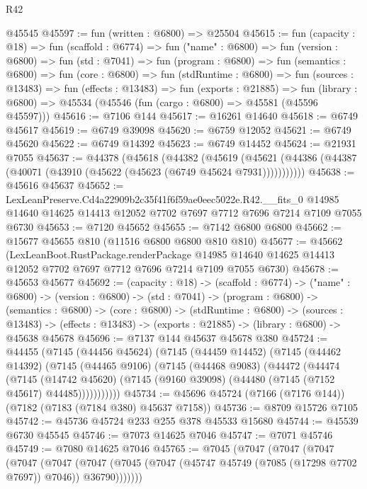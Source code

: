 \begin{lexlean}{R42}
\begin{coremodule}
{    @45545
@45597 := fun (written : @6800) => @25504
@45615 := fun (capacity : @18) =>
  fun (scaffold : @6774) =>
  fun ("name" : @6800) =>
  fun (version : @6800) =>
  fun (std : @7041) =>
  fun (program : @6800) =>
  fun (semantics : @6800) =>
  fun (core : @6800) =>
  fun (stdRuntime : @6800) =>
  fun (sources : @13483) =>
  fun (effects : @13483) =>
  fun (exports : @21885) =>
  fun (library : @6800) => @45534 (@45546 (fun (cargo : @6800) => @45581 (@45596 @45597)))
@45616 := @7106 @144
@45617 := @16261 @14640
@45618 := @6749 @45617
@45619 := @6749 @39098
@45620 := @6759 @12052
@45621 := @6749 @45620
@45622 := @6749 @14392
@45623 := @6749 @14452
@45624 := @21931 @7055
@45637 := @44378
    (@45618
      (@44382
        (@45619
          (@45621 (@44386 (@44387 (@40071 (@43910 (@45622 (@45623 (@6749 @45624 @7931)))))))))))
@45638 := @45616 @45637
@45652 := LexLeanPreserve.Cd4a22909b2c35f41f6f59ae0eec5022e.R42.__fits_0
    @14985
    @14640
    @14625
    @14413
    @12052
    @7702
    @7697
    @7712
    @7696
    @7214
    @7109
    @7055
    @6730
@45653 := @7120 @45652
@45655 := @7142 @6800 @6800
@45662 := @15677 @45655 @810 (@11516 @6800 @6800 @810 @810)
@45677 := @45662
    (LexLeanBoot.RustPackage.renderPackage
      @14985
      @14640
      @14625
      @14413
      @12052
      @7702
      @7697
      @7712
      @7696
      @7214
      @7109
      @7055
      @6730)
@45678 := @45653 @45677
@45692 := (capacity : @18) ->
  (scaffold : @6774) ->
  ("name" : @6800) ->
  (version : @6800) ->
  (std : @7041) ->
  (program : @6800) ->
  (semantics : @6800) ->
  (core : @6800) ->
  (stdRuntime : @6800) ->
  (sources : @13483) ->
  (effects : @13483) -> (exports : @21885) -> (library : @6800) -> @45638 @45678
@45696 := @7137 @144 @45637 @45678 @380
@45724 := @44455
    (@7145
      (@44456 @45624)
      (@7145
        (@44459 @14452)
        (@7145
          (@44462 @14392)
          (@7145
            (@44465 @9106)
            (@7145
              (@44468 @9083)
              (@44472
                (@44474
                  (@7145
                    (@14742 @45620)
                    (@7145 (@9160 @39098) (@44480 (@7145 (@7152 @45617) @44485)))))))))))
@45734 := @45696 @45724 (@7166 (@7176 @144)) (@7182 (@7183 (@7184 @380) @45637 @7158))
@45736 := @8709 @15726 @7105
@45742 := @45736 @45724 @233 @255 @378 @45533 @15680
@45744 := @45539 @6730 @45545
@45746 := @7073 @14625 @7046
@45747 := @7071 @45746
@45749 := @7080 @14625 @7046
@45765 := @7045
    (@7047
      (@7047
        (@7047
          (@7047
            (@7047
              (@7047 (@7045 (@7047 (@45747 @45749 (@7085 (@17298 @7702 @7697)) @7046)) @36790)))))))
}
\end{coremodule}
\end{lexlean}
